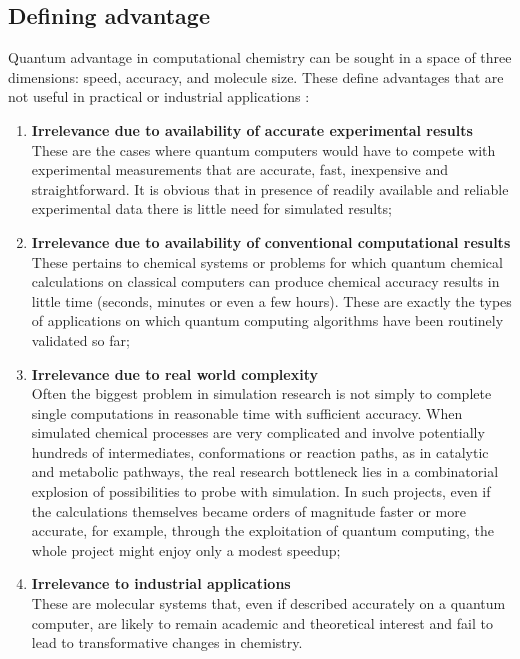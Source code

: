\subsection{Defining advantage}
Quantum advantage in computational chemistry can be sought in a space of three dimensions: speed, accuracy, and molecule size. These define advantages that are not useful in practical or industrial applications \cite{Elfving2020Sep}:
\begin{enumerate}
    \item \textbf{Irrelevance due to availability of accurate experimental results} \\
    These are the cases where quantum computers would have to compete with experimental measurements that are accurate, fast, inexpensive and straightforward. It is obvious that in presence of readily available and reliable experimental data there is little need for simulated results;
    
    \item \textbf{Irrelevance due to availability of conventional computational results} \\
    These pertains to chemical systems or problems for which quantum chemical calculations on classical computers can produce chemical accuracy results in little time (seconds, minutes or even a few hours). These are exactly the types of applications on which quantum computing algorithms have been routinely validated so far;
    
    \item \textbf{Irrelevance due to real world complexity} \\
    Often the biggest problem in simulation research is not simply to complete single computations in reasonable time with sufficient accuracy. When simulated chemical processes are very complicated and involve potentially hundreds of intermediates, conformations or reaction paths, as in catalytic and metabolic pathways, the real research bottleneck lies in a combinatorial explosion of possibilities to probe with simulation. In such projects, even if the calculations themselves became orders of magnitude faster or more accurate, for example, through the exploitation of quantum computing, the whole project might enjoy only a modest speedup;
    
    \item \textbf{Irrelevance to industrial applications} \\
    These are molecular systems that, even if described accurately on a quantum computer, are likely to remain academic and theoretical interest and fail to lead to transformative changes in chemistry.
\end{enumerate}

